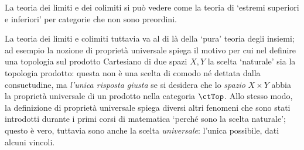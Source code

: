 La teoria dei limiti e dei colimiti si può vedere come la teoria di `estremi superiori e inferiori' per categorie che non sono preordini.

\medskip
La teoria dei limiti e colimiti tuttavia va al di là della `pura' teoria degli insiemi; ad esempio la nozione di proprietà universale spiega il motivo per cui nel definire una topologia sul prodotto Cartesiano di due spazi \(X,Y\) la scelta `naturale' sia la topologia prodotto: questa non è una scelta di comodo né dettata dalla consuetudine, ma \emph{l'unica risposta giusta} se si desidera che lo \emph{spazio} \(X\times Y\) abbia la proprietà universale di un prodotto nella categoria \(\ctTop\). Allo stesso modo, la definizione di proprietà universale spiega diversi altri fenomeni che sono stati introdotti durante i primi corsi di matematica `perché sono la scelta naturale'; questo è vero, tuttavia sono anche la scelta \emph{universale}: l'unica possibile, dati alcuni vincoli.
